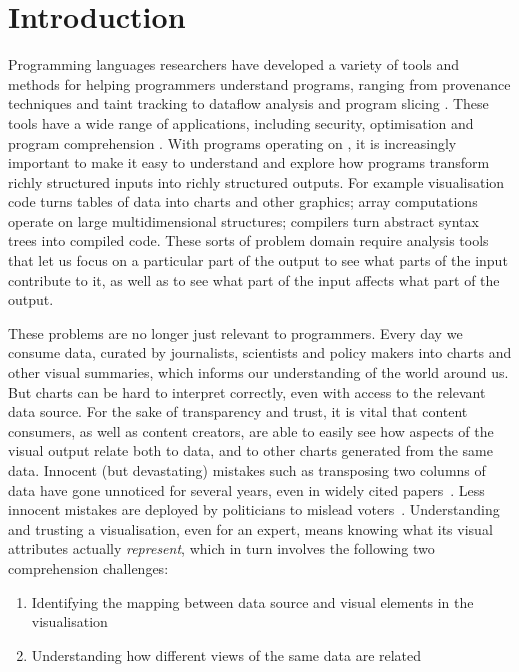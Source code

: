 \section{Introduction}

Programming languages researchers have developed a variety of tools and methods for helping programmers understand programs, ranging from provenance techniques and taint tracking to dataflow analysis and program slicing . These tools have a wide range of applications, including security, optimisation and program comprehension . With programs operating on , it is increasingly important to make it easy to understand and explore how programs transform richly structured inputs into richly structured outputs. For example visualisation code turns tables of data into charts and other graphics; array computations operate on large multidimensional structures; compilers turn abstract syntax trees into compiled code. These sorts of problem domain require analysis tools that let us focus on a particular part of the output to see what parts of the input contribute to it, as well as to see what part of the input affects what part of the output. 

These problems are no longer just relevant to programmers. Every day we consume data, curated by journalists, scientists and policy makers into charts and other visual summaries, which informs our understanding of the world around us. But charts can be hard to interpret correctly, even with access to the relevant data source. For the sake of transparency and trust, it is vital that content consumers, as well as content creators, are able to easily see how aspects of the visual output relate both to data, and to other charts generated from the same data. Innocent (but devastating) mistakes such as transposing two columns of data have gone unnoticed for several years, even in widely cited papers~\cite{miller06}. Less innocent mistakes are deployed by politicians to mislead voters~\cite{fullfact19}. Understanding and trusting a visualisation, even for an expert, means knowing what its visual attributes actually \emph{represent}, which in turn involves the following two comprehension challenges:

\begin{enumerate}
  \item Identifying the mapping between data source and visual elements in the visualisation
  \item Understanding how different views of the same data are related
\end{enumerate}

